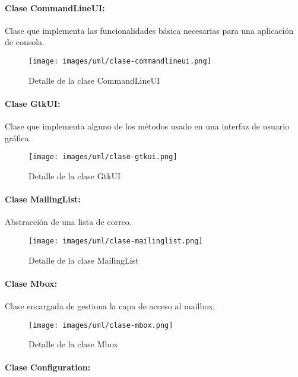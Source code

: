 \paragraph{Clase CommandLineUI:}

Clase que implementa las funcionalidades básica necesarias para una aplicación
de consola.

\begin{figure}[H]
	\centering
 	\texttt{[image: images/uml/clase-commandlineui.png]}
	\caption{Detalle de la clase CommandLineUI}
	\label{fig:uml:commandlineui-class}
\end{figure}

\paragraph{Clase GtkUI:}

Clase que implementa alguno de los métodos usado en una interfaz de usuario
gráfica.

\begin{figure}[H]
	\centering
 	\texttt{[image: images/uml/clase-gtkui.png]}
	\caption{Detalle de la clase GtkUI}
	\label{fig:uml:swaml-class}
\end{figure}

\paragraph{Clase MailingList:}

Abstracción de una lista de correo.

\begin{figure}[H]
	\centering
 	\texttt{[image: images/uml/clase-mailinglist.png]}
	\caption{Detalle de la clase MailingList}
	\label{fig:uml:mailinglist-class}
\end{figure}

\paragraph{Clase Mbox:}

Clase encargada de gestiona la capa de acceso al mailbox.

\begin{figure}[H]
	\centering
 	\texttt{[image: images/uml/clase-mbox.png]}
	\caption{Detalle de la clase Mbox}
	\label{fig:uml:mbox-class}
\end{figure}

\paragraph{Clase Configuration:}

